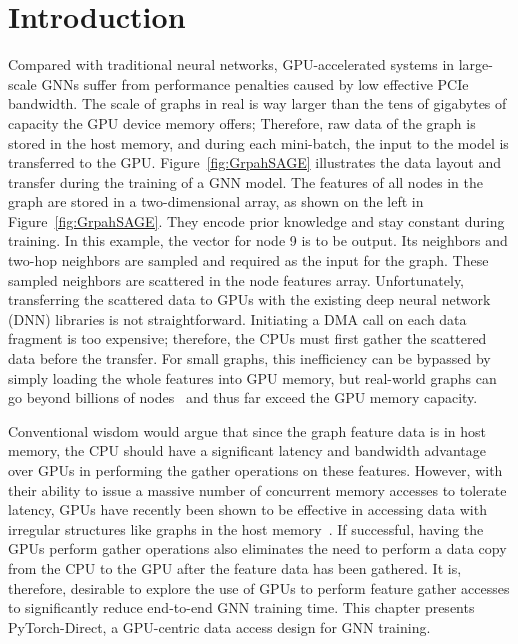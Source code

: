 \section{Introduction}



Compared with traditional neural networks, GPU-accelerated systems in large-scale GNNs suffer from performance penalties caused by low effective PCIe bandwidth.
The scale of graphs in real  is way larger than the tens of gigabytes of capacity the GPU device memory offers;
Therefore, raw data of the graph is stored in the host memory, and during each mini-batch, the input to the model is transferred to the GPU.
Figure~\ref{fig:GrpahSAGE} illustrates the data layout and transfer during the training of a GNN model.
The features of all nodes in the graph are stored in a two-dimensional array, as shown on the left in Figure~\ref{fig:GrpahSAGE}.
They encode prior knowledge and stay constant during training.
In this example, the vector for node 9 is to be output.
Its neighbors and two-hop neighbors are sampled and required as the input for the graph.
These sampled neighbors are scattered in the node features array.
Unfortunately, transferring the scattered data to GPUs with the existing deep neural network (DNN) libraries is not straightforward.
Initiating a DMA call on each data fragment is too expensive; therefore, the CPUs must first gather the scattered data before the transfer.
For small graphs, this inefficiency can be bypassed by simply loading the whole features into GPU memory, but real-world graphs can go beyond billions of nodes~\cite{Pinterest} and thus far exceed the GPU memory capacity.

Conventional wisdom would argue that since the graph feature data is in host memory, the CPU should have a significant latency and bandwidth advantage over GPUs in performing the gather operations on these features. However, with their ability to issue a massive number of concurrent memory accesses to tolerate latency, GPUs have recently been shown to be effective in accessing data with irregular structures like graphs in the host memory~\cite{minEMOGIEfficientMemoryaccess2020}. If successful, having the GPUs perform gather operations also eliminates the need to perform a data copy from the CPU to the GPU after the feature data has been gathered.
It is, therefore, desirable to explore the use of GPUs to perform feature gather accesses to significantly reduce end-to-end GNN training time. %
This chapter presents PyTorch-Direct, a GPU-centric data access design for GNN training.



